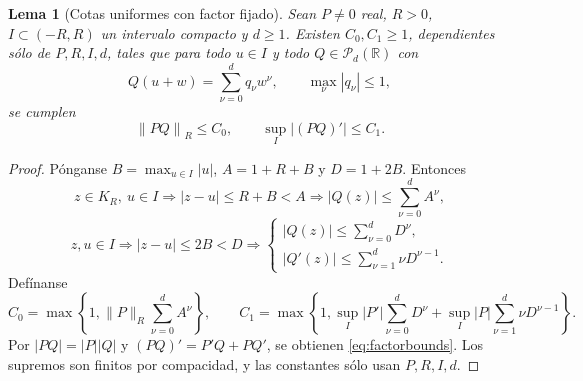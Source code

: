 \documentclass[11pt,a4paper]{article}
\numberwithin{equation}{section}
\newtheorem{lemma}[theorem]{Lema}
\theoremstyle{definition}
\theoremstyle{remark}
\newcommand{\R}{\mathbb R}
\newcommand{\PP}{\mathcal P}
\newcommand{\norm}[1]{\left\lVert#1\right\rVert}
\begin{document}
\begin{lemma}[Cotas uniformes con factor fijado]\label{lem:factorbounds}
Sean $P\ne0$ real, $R>0$, $I\subset(-R,R)$ un intervalo compacto y $d\ge1$. Existen $C_0,C_1\ge1$, dependientes sólo de $P,R,I,d$, tales que para todo $u\in I$ y todo $Q\in\PP_d(\R)$ con
\[
Q(u+w)=\sum_{\nu=0}^dq_\nu w^\nu,\qquad \max_\nu|q_\nu|\le1,
\]
se cumplen
\begin{equation}\label{eq:factorbounds}
\norm{PQ}_R\le C_0,\qquad \sup_I|(PQ)'|\le C_1.
\end{equation}
\end{lemma}
\begin{proof}
Pónganse $B=\max_{u\in I}|u|$, $A=1+R+B$ y $D=1+2B$. Entonces
\[
z\in K_R,\ u\in I\Longrightarrow |z-u|\le R+B<A
\Longrightarrow |Q(z)|\le\sum_{\nu=0}^dA^\nu,
\]
\[
z,u\in I\Longrightarrow |z-u|\le2B<D
\Longrightarrow
\begin{cases}|Q(z)|\le\sum_{\nu=0}^dD^\nu,\\
|Q'(z)|\le\sum_{\nu=1}^d\nu D^{\nu-1}.
\end{cases}
\]
Defínanse
\[
C_0=\max\left\{1,\|P\|_R\sum_{\nu=0}^dA^\nu\right\},\qquad
C_1=\max\left\{1,\sup_I|P'|\sum_{\nu=0}^dD^\nu+
\sup_I|P|\sum_{\nu=1}^d\nu D^{\nu-1}\right\}.
\]
Por $|PQ|=|P||Q|$ y $(PQ)'=P'Q+PQ'$, se obtienen \eqref{eq:factorbounds}. Los supremos son finitos por compacidad, y las constantes sólo usan $P,R,I,d$.
\end{proof}
\end{document}
